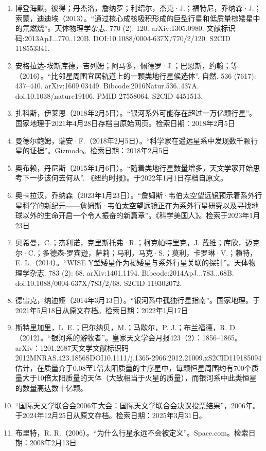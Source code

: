 \begin{enumerate}
\item 博登海默，彼得；丹杰洛，詹纳罗；利绍尔，杰克·J.；福特尼，乔纳森·J.；索蒙，迪迪埃（2013）。“通过核心成核吸积形成的巨型行星和低质量棕矮星中的氘燃烧”。天体物理学杂志. 770 (2): 120. arXiv:1305.0980. 文献标识码:2013ApJ...770..120B. DOI:10.1088/0004-637X/770/2/120. S2CID 118553341.
\item 安格拉达-埃斯库德，吉列姆；阿马多，佩德罗·J.；巴恩斯，约翰；等（2016）。“比邻星周围宜居轨道上的一颗类地行星候选体”. 自然. 536 (7617): 437–440. arXiv:1609.03449. Bibcode:2016Natur.536..437A. doi:10.1038/nature19106. PMID 27558064. S2CID 4451513.
\item 扎科斯，伊莱恩（2018年2月5日）。“银河系外可能存在超过一万亿颗行星”。国家地理于2021年4月28日存档自原始网页。检索日期：2018年2月5日
\item 曼德尔鲍姆，瑞安·F.（2018年2月5日）。“科学家在遥远星系中发现数千颗行星的证据”。Gizmodo。检索日期：2018年2月5日
\item 奥布赖，丹尼斯（2015年1月6日）。“随着类地行星数量增多，天文学家开始思考下一步该何去何从”. 《纽约时报》。于2022年1月1日存档自原文。
\item 奥卡拉汉，乔纳森（2023年1月23日）。“詹姆斯·韦伯太空望远镜预示着系外行星科学的新纪元——詹姆斯·韦伯太空望远镜正在为系外行星研究以及寻找地球以外的生命开启一个令人振奋的新篇章”。《科学美国人》。检索于2023年1月23日
\item 贝希曼，C.；杰利诺，克里斯托弗·R.；柯克帕特里克，J. 戴维；库欣，迈克尔·C.；多德森-罗宾逊，萨莉；马利，马克·S.；莫利，卡罗琳·V.；赖特，E. L.（2014）。“WISE Y型矮星作为褐矮星与系外行星关联的探针”。天体物理学杂志. 783 (2): 68. arXiv:1401.1194. Bibcode:2014ApJ...783...68B. doi:10.1088/0004-637X/783/2/68. S2CID 119302072.
\item 德雷克，纳迪娅（2014年3月13日）。“银河系中孤独行星指南”。国家地理。于2021年5月18日从原文存档。检索日期：2022年1月17日
\item 斯特里加里，L. E.；巴尔纳贝，M.；马歇尔，P. J.；布兰福德，R. D.（2012）。“银河系的游牧者”。皇家天文学会月报423（2）：1856–1865。arXiv：1201.2687天文学文献标识码2012MNRAS.423.1856SDOI10.1111/j.1365-2966.2012.21009.xS2CID119185094估计，在质量介于0.08至1倍太阳质量的主序星中，每颗恒星周围约有700个质量大于10倍太阳质量的天体（大致相当于火星的质量），而银河系中此类恒星的数量高达数十亿颗。
\item “国际天文学联合会2006年大会：国际天文学联合会决议投票结果”，2006年。于2024年12月25日从原文存档。检索日期：2025年3月31日。
\item 布里特，R. R.（2006）。“为什么行星永远不会被定义”。Space.com。检索日期：2008年2月13日

\end{enumerate}
